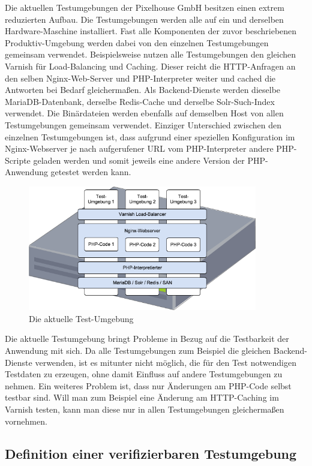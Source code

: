 Die aktuellen Testumgebungen der Pixelhouse GmbH besitzen einen extrem reduzierten Aufbau. Die Testumgebungen werden alle auf ein und derselben Hardware-Maschine installiert. Fast alle Komponenten der zuvor beschriebenen Produktiv-Umgebung werden dabei von den einzelnen Testumgebungen gemeinsam verwendet. Beispielsweise nutzen alle Testumgebungen den gleichen Varnish für Load-Balancing und Caching. Dieser reicht die HTTP-Anfragen an den selben Nginx-Web-Server und PHP-Interpreter weiter und cached die Antworten bei Bedarf gleichermaßen. Als Backend-Dienste werden dieselbe MariaDB-Datenbank, derselbe Redis-Cache und derselbe Solr-Such-Index verwendet. Die Binärdateien werden ebenfalls auf demselben Host von allen Testumgebungen gemeinsam verwendet. Einziger Unterschied zwischen den einzelnen Testumgebungen ist, dass aufgrund einer speziellen Konfiguration im Nginx-Webserver je nach aufgerufener URL vom PHP-Interpreter andere PHP-Scripte geladen werden und somit jeweils eine andere Version der PHP-Anwendung getestet werden kann.

\begin{figure}[!ht]
  \begin{center}
    \includegraphics[width=10cm]{bilder/Aktuelle-Testumgebung.png}
    \caption{Die aktuelle Test-Umgebung}
  \end{center}
\end{figure}

Die aktuelle Testumgebung bringt Probleme in Bezug auf die Testbarkeit der Anwendung mit sich. Da alle Testumgebungen zum Beispiel die gleichen Backend-Dienste verwenden, ist es mitunter nicht möglich, die für den Test notwendigen Testdaten zu erzeugen, ohne damit Einfluss auf andere Testumgebungen zu nehmen. Ein weiteres Problem ist, dass nur Änderungen am PHP-Code selbst testbar sind. Will man zum Beispiel eine Änderung am HTTP-Caching im Varnish testen, kann man diese nur in allen Testumgebungen gleichermaßen vornehmen.

\subsection{Definition einer verifizierbaren Testumgebung}

